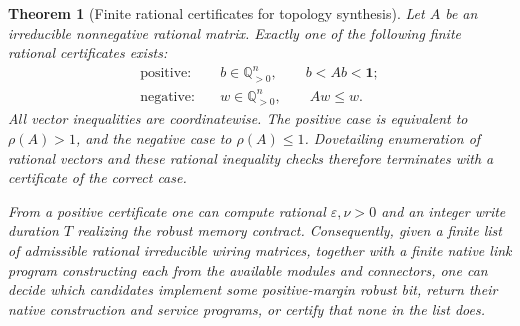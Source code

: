 \documentclass[11pt]{article}
\newtheorem{theorem}{Theorem}[section]
\theoremstyle{definition}
\theoremstyle{remark}
\begin{document}
\begin{theorem}[Finite rational certificates for topology synthesis]
\label{thm:rational-synthesis}
Let $A$ be an irreducible nonnegative rational matrix. Exactly one of the
following finite rational certificates exists:
\begin{align}
 \text{positive:}\quad&b\in\mathbb Q_{>0}^{n},
                \qquad b<Ab<\boldsymbol1;\label{eq:positive-cert}\\
 \text{negative:}\quad&w\in\mathbb Q_{>0}^{n},
                \qquad Aw\leq w.\label{eq:negative-cert}
\end{align}
All vector inequalities are coordinatewise. The positive case is
equivalent to $\rho(A)>1$, and the negative case to $\rho(A)\leq1$.
Dovetailing enumeration of rational vectors and these rational inequality
checks therefore terminates with a certificate of the correct case.

From a positive certificate one can compute rational $\varepsilon,\nu>0$
and an integer write duration $T$ realizing the robust memory contract.
Consequently, given a finite list of admissible rational irreducible
wiring matrices, together with a finite native link program constructing
each from the available modules and connectors, one can decide which
candidates implement some positive-margin robust bit, return their native
construction and service programs, or certify that none in the list does.
\end{theorem}
\end{document}
